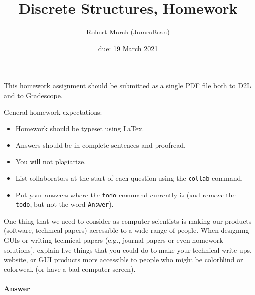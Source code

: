 \documentclass{article}
\title{Discrete Structures, Homework \hwnum}
\author{Robert Marsh (JamesBean)}
\date{due: 19 March 2021}
\begin{document}
\maketitle

This homework assignment should be
submitted as a single PDF file both to D2L and to Gradescope.

General homework expectations:
\begin{itemize}
    \item Homework should be typeset using LaTex.
    \item Answers should be in complete sentences and proofread.
    \item You will not plagiarize.
    \item List collaborators at the start of each question using the \texttt{collab} command.
    \item Put your answers where the \texttt{todo} command currently is (and
        remove the \texttt{todo}, but not the word \texttt{Answer}).
\end{itemize}


\collab{} 

One thing that we need to consider as computer scientists is making our products
(software, technical papers) accessible to a wide range of people. When
designing GUIs or writing technical papers (e.g., journal papers or even
homework solutions), explain five things that you could do to make your
technical write-ups, website, or GUI products more accessible to people who
might be colorblind or colorweak (or have a bad computer screen).


\paragraph{Answer}
\end{document}
